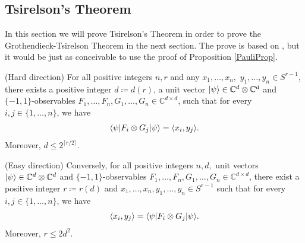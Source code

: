 \subsection{Tsirelson's Theorem}
	In this section we will prove Tsirelson's Theorem in order to prove the Grothendieck-Tsirelson Theorem in the next section. The prove is based on \cite{B}, but it would be just as conceivable to use the proof of Proposition \ref{PauliProp}. 
	
	\begin{theo}[Tsirelson] \label{theo:Tsirelson}
		(Hard direction) For all positive integers $n, r$ and any $x_1,\dots,x_n,$ $y_1,\dots,y_n\in S^{r-1}$, there exists a positive integer $d\coloneqq d(r)$, a unit vector $\vert {\psi} \rangle\in\mathbb{C}^d\otimes\mathbb{C}^d$ and $\{-1,1\}$-observables $F_1,\dots,F_n,G_1,\dots,G_n\in \mathbb{C}^{d\times d}$, such that for every $i,j\in\{1,\dots,n\}$, we have
		\begin{equation}
			\langle {\psi} \vert F_i\otimes G_j \vert {\psi} \rangle = \langle{x_i},{y_j}\rangle.
		\end{equation}
		Moreover, $d\leq 2^{\lceil r/2 \rceil}$.
		
		(Easy direction) Conversely, for all positive integers $n,d,$ unit vectors $\vert {\psi} \rangle\in \mathbb{C}^d\otimes\mathbb{C}^d$ and $\{-1,1\}$-observables $F_1,\dots,F_n,G_1,\dots,G_n\in \mathbb{C}^{d\times d}$, there exist a positive integer $r\coloneqq r(d)$ and $x_1,\dots,x_n,y_1,\dots,y_n\in S^{r-1}$ such that for every $i,j\in\{1,\dots,n\}$, we have
		\begin{equation}
			\langle{x_i},{y_j}\rangle = \langle {\psi} \vert F_i\otimes G_j \vert {\psi} \rangle.
		\end{equation}
		Moreover, $r\leq 2d^2$.
	\end{theo}
